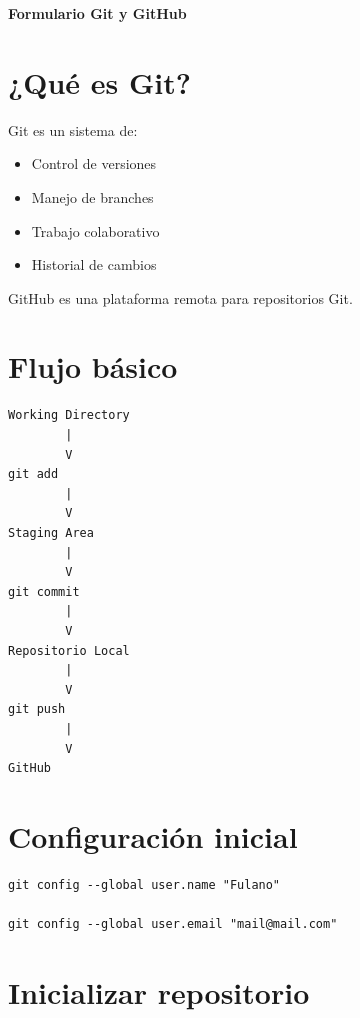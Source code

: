 \documentclass[a4paper,11pt]{article}
\begin{document}
\begin{center}
    {\Large \textbf{Formulario Git y GitHub}}\\
\end{center}


\section*{¿Qué es Git?}

Git es un sistema de:
\begin{itemize}
    \item Control de versiones
    \item Manejo de branches
    \item Trabajo colaborativo
    \item Historial de cambios
\end{itemize}

GitHub es una plataforma remota para repositorios Git.


\section*{Flujo básico}

\begin{lstlisting}
Working Directory
        |
        V
git add
        |
        V
Staging Area
        |
        V
git commit
        |
        V
Repositorio Local
        |
        V
git push
        |
        V
GitHub
\end{lstlisting}


\section*{Configuración inicial}

\begin{lstlisting}
git config --global user.name "Fulano"

git config --global user.email "mail@mail.com"
\end{lstlisting}


\section*{Inicializar repositorio}
\end{document}
